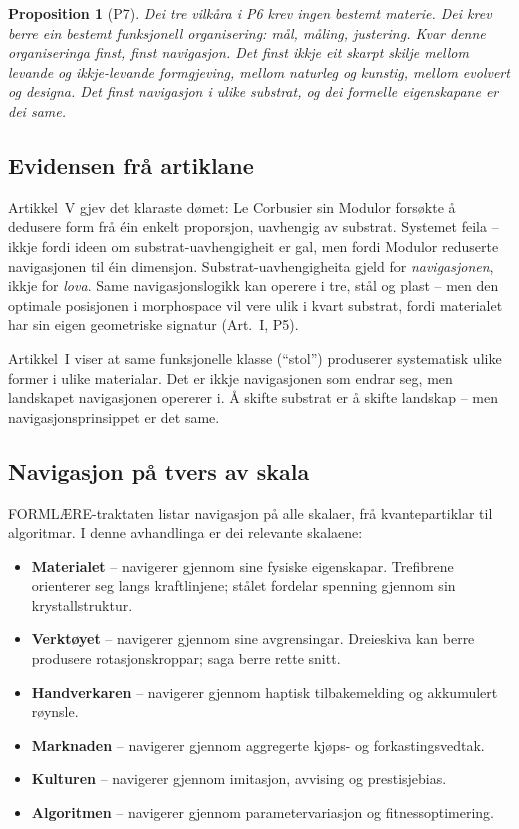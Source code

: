 \documentclass[12pt,a4paper,oneside]{report}
\newtheorem{proposition}[theorem]{Proposition}
\begin{document}
\begin{proposition}[P7]
Dei tre vilkåra i P6 krev ingen bestemt materie. Dei krev berre ein bestemt funksjonell organisering: mål, måling, justering. Kvar denne organiseringa finst, finst navigasjon. Det finst ikkje eit skarpt skilje mellom levande og ikkje-levande formgjeving, mellom naturleg og kunstig, mellom evolvert og designa. Det finst navigasjon i ulike substrat, og dei formelle eigenskapane er dei same.
\end{proposition}

\subsection{Evidensen frå artiklane}

Artikkel~V gjev det klaraste dømet: Le Corbusier sin Modulor forsøkte å dedusere form frå éin enkelt proporsjon, uavhengig av substrat. Systemet feila -- ikkje fordi ideen om substrat-uavhengigheit er gal, men fordi Modulor reduserte navigasjonen til éin dimensjon. Substrat-uavhengigheita gjeld for \emph{navigasjonen}, ikkje for \emph{lova}. Same navigasjonslogikk kan operere i tre, stål og plast -- men den optimale posisjonen i morphospace vil vere ulik i kvart substrat, fordi materialet har sin eigen geometriske signatur (Art.~I, P5).

Artikkel~I viser at same funksjonelle klasse (``stol'') produserer systematisk ulike former i ulike materialar. Det er ikkje navigasjonen som endrar seg, men landskapet navigasjonen opererer i. Å skifte substrat er å skifte landskap -- men navigasjonsprinsippet er det same.

\subsection{Navigasjon på tvers av skala}

FORMLÆRE-traktaten listar navigasjon på alle skalaer, frå kvantepartiklar til algoritmar. I denne avhandlinga er dei relevante skalaene:

\begin{itemize}
  \item \textbf{Materialet} -- navigerer gjennom sine fysiske eigenskapar. Trefibrene orienterer seg langs kraftlinjene; stålet fordelar spenning gjennom sin krystallstruktur.
  \item \textbf{Verktøyet} -- navigerer gjennom sine avgrensingar. Dreieskiva kan berre produsere rotasjonskroppar; saga berre rette snitt.
  \item \textbf{Handverkaren} -- navigerer gjennom haptisk tilbakemelding og akkumulert røynsle.
  \item \textbf{Marknaden} -- navigerer gjennom aggregerte kjøps- og forkastingsvedtak.
  \item \textbf{Kulturen} -- navigerer gjennom imitasjon, avvising og prestisjebias.
  \item \textbf{Algoritmen} -- navigerer gjennom parametervariasjon og fitnessoptimering.
\end{itemize}
\end{document}
